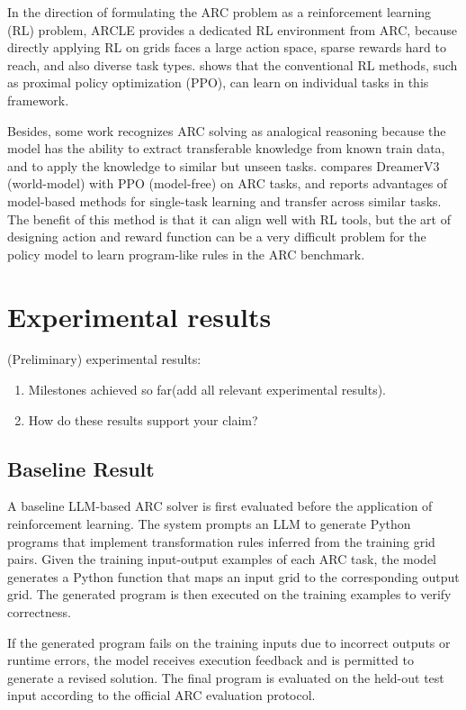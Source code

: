 \documentclass[11pt,letterpaper]{article}
\begin{document}
In the direction of formulating the ARC problem as a reinforcement learning (RL) problem, ARCLE provides a dedicated RL environment from ARC, because directly applying RL on grids faces a large action space, sparse rewards hard to reach, and also diverse task types.
\citet{lee2024arcleabstractionreasoningcorpus} shows that the conventional RL methods, such as proximal policy optimization (PPO), can learn on individual tasks in this framework.

Besides, some work recognizes ARC solving as analogical reasoning because the model has the ability to extract transferable knowledge from known train data, and to apply the knowledge to similar but unseen tasks.
\citet{lee2024enhancinganalogicalreasoningabstraction} compares DreamerV3 (world-model) with PPO (model-free) on ARC tasks, and reports advantages of model-based methods for single-task learning and transfer across similar tasks.
The benefit of this method is that it can align well with RL tools, but the art of designing action and reward function can be a very difficult problem for the policy model to learn program-like rules in the ARC benchmark.

\section{Experimental results}
{\color{red}
(Preliminary) experimental results:
\begin{enumerate}
    \item Milestones achieved so far(add all relevant experimental results).
    \item How do these results support your claim?
\end{enumerate}
}
\subsection{Baseline Result}
A baseline LLM-based ARC solver is first evaluated before the application of reinforcement learning. The system prompts an LLM to generate Python programs that implement transformation rules inferred from the training grid pairs. Given the training input-output examples of each ARC task, the model generates a Python function that maps an input grid to the corresponding output grid. The generated program is then executed on the training examples to verify correctness.

If the generated program fails on the training inputs due to incorrect outputs or runtime errors, the model receives execution feedback and is permitted to generate a revised solution. The final program is evaluated on the held-out test input according to the official ARC evaluation protocol.
\end{document}
